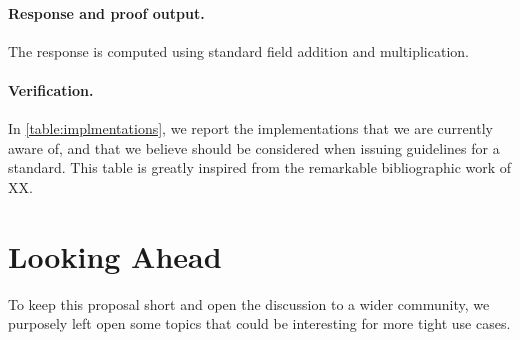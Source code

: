 \documentclass[runningheads]{llncs}
\begin{document}
\paragraph{Response and proof output.} The response is computed using standard field addition and multiplication.
\paragraph{Verification.}




In \cref{table:implmentations}, we report the implementations that we are currently aware of, and that we believe should be considered when issuing guidelines for a standard.
This table is greatly inspired from the remarkable bibliographic work of XX.
\section{Looking Ahead}
To keep this proposal short and open the discussion to a wider community, we purposely left open some topics that could
be interesting for more tight use cases.



%
\end{document}
